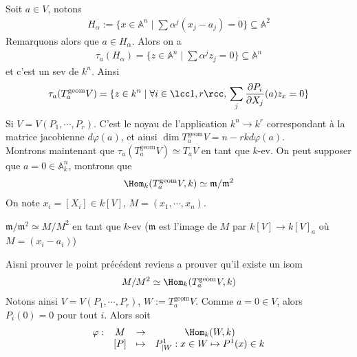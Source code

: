             Soit $a \in V$, notons
            \begin{align*}
                H_\alpha := \{x \in \mathbb{A}^n \mid \sum \alpha^j (x_j - a_j) = 0\} \subseteq \mathbb{A}^2
            \end{align*}
            Remarquons alors que $a \in H_\alpha$. Alors on a
            \begin{align*}
                \tau_a(H_\alpha) = \{z \in \mathbb{A}^n \mid \sum \alpha^jz_j = 0\} \subseteq \mathbb{A}^n
            \end{align*}
            et c'est un sev de $k^n$. Ainsi 
            \begin{align*}
                \tau_a(T_a^\mathrm{geom}V) = \{z \in k^n \mid \forall i \in \lcc 1,r \rcc,\, \sum_j \frac{\partial P_i}{\partial X_j}(a) z_x = 0\}
            \end{align*}
            Si $V = V(P_1, \cdots, P_r)$. C'est le noyau de l'application $k^n \to k^r$ correspondant à la matrice jacobienne $d \varphi(a)$, et ainsi $\dim T_a^\mathrm{geom}V = n - rk d \varphi(a)$. \\
            Montrons maintenant que $\tau_a(T_a^\mathrm{geom}V) \simeq T_aV$ en tant que $k$-ev. On peut supposer que $a = 0 \in \mathbb{A}^n_k$, montrons que 
            \begin{align*}
                \Hom_k(T_a^\mathrm{geom}V, k) \simeq \mathfrak{m}/\mathfrak{m}^2
            \end{align*}
            On note $x_i = [X_i] \in k[V]$, $M = (x_1, \cdots, x_n)$.
            \begin{exo}
                $\mathfrak{m}/\mathfrak{m}^2 \simeq M/M^2$ en tant que $k$-ev ($\mathfrak{m}$ est l'image de $M$ par $k[V] \to k[V]_a$ où $M = (x_i - a_i)$) 
            \end{exo}
            Aisni prouver le point précédent reviens a prouver qu'il existe un isom
            \begin{align*}
                M/M^2 \simeq \Hom_k(T_a^\mathrm{geom}V, k) 
            \end{align*}
            Notons ainsi $V = V(P_1, \cdots, P_r)$, $W := T_a^\mathrm{geom}V$. Comme $a = 0 \in V$, alors $P_i(0) = 0$ pour tout $i$. Alors soit
            \begin{align*}
                \begin{array}{cccc}
                    \varphi : & M & \to & \Hom_k(W,k) \\
                    & [P] & \mapsto & P^1_{|W} : x \in W \mapsto P^1(x) \in k \\
                \end{array}
            \end{align*}
